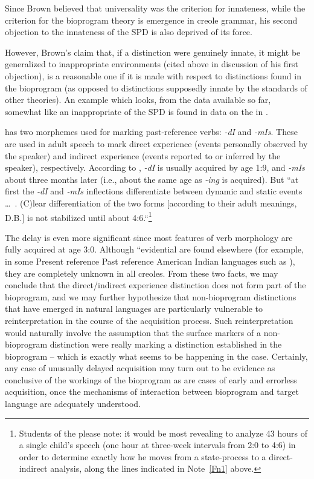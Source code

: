 Since Brown believed that universality was the criterion for innateness, while the criterion for the bioprogram theory is emergence
in creole grammar, his second objection to the innateness of the SPD is also deprived of its force.

However, Brown's claim that, if a distinction were genuinely innate, it might be generalized to inappropriate environments (cited above in discussion of his first objection), is a reasonable one if it is made with respect to distinctions found in the bioprogram (as opposed to distinctions supposedly innate by the standards of other theories). An example which looks, from the data available so far, somewhat like an inappropriate  of the SPD is found in data on the
  in \citet{SlobinEtAl1980}.

 has two morphemes used for marking past-reference verbs: \textit{-dI} and \textit{-mIs}. These are used in adult speech to mark direct experience (events personally observed by the speaker) and indirect experience (events reported to or inferred by the speaker), respectively. According to \citeauthor{SlobinEtAl1980}, \textit{-dI} is usually acquired by age 1:9, and \textit{-mIs} about three months later (i.e., about the same age as \textit{-ing} is acquired). But ``at first the \textit{-dI} and \textit{-mIs} inflections differentiate between dynamic and static events \ldots~. (C)lear differentiation of the two forms [according to their adult meanings, D.B.] is not stabilized until about 4:6.``\footnote{Students of the   please note: it would be most revealing to analyze 43 hours of a single child's speech (one hour at three-week intervals from 2:0 to 4:6) in order to determine exactly how he moves from a state-process to a direct-indirect analysis, along the lines indicated in Note~\ref{Fn1} above.}

The delay  is even more significant since most features of  verb morphology are fully acquired at age 3:0. Although ``evidential  are found elsewhere (for example, in some Present reference Past reference American Indian languages such as ), they are completely un\-known in all creoles. From these two facts, we may conclude that the direct/indirect experience distinction does not form part of the bio\-program, and we may further hypothesize that non-bioprogram distinctions that have emerged in natural languages are particularly vulnerable to reinterpretation in the course of the acquisition process. Such reinterpretation would naturally involve the assumption that the surface markers of a non-bioprogram distinction were really marking a distinction established in the bioprogram -- which is exactly what seems to be happening in the  case. Certainly, any case of unusually delayed acquisition may turn out to be evidence as conclusive
of the workings of the bioprogram as are cases of early and errorless acquisition, once the mechanisms of interaction between bioprogram and target language are adequately understood.

